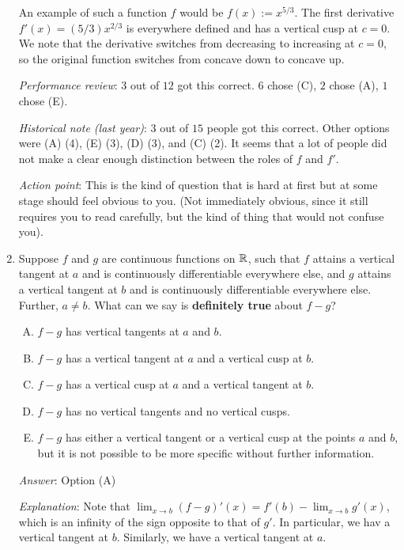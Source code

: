 \documentclass[10pt]{amsart}
\begin{document}
\begin{enumerate}
  An example of such a function $f$ would be $f(x) := x^{5/3}$. The
  first derivative $f'(x) = (5/3)x^{2/3}$ is everywhere defined and
  has a vertical cusp at $c = 0$. We note that the derivative switches
  from decreasing to increasing at $c = 0$, so the original function
  switches from concave down to concave up.
  
  {\em Performance review}: $3$ out of $12$ got this correct. $6$
  chose (C), $2$ chose (A), $1$ chose (E).

  {\em Historical note (last year)}: $3$ out of $15$ people got this
  correct. Other options were (A) (4), (E) (3), (D) (3), and (C) (2).
  It seems that a lot of people did not make a clear enough
  distinction between the roles of $f$ and $f'$.

  {\em Action point}: This is the kind of question that is hard at
  first but at some stage should feel obvious to you. (Not immediately
  obvious, since it still requires you to read carefully, but the kind
  of thing that would not confuse you).

\item Suppose $f$ and $g$ are continuous functions on $\mathbb{R}$, such that
  $f$ attains a vertical tangent at $a$ and is continuously
  differentiable everywhere else, and $g$ attains a vertical tangent
  at $b$ and is continuously differentiable everywhere else. Further,
  $a \ne b$. What can we say is {\bf definitely true} about $f - g$?

  \begin{enumerate}[(A)]
  \item $f - g$ has vertical tangents at $a$ and $b$.
  \item $f - g$ has a vertical tangent at $a$ and a vertical cusp at $b$.
  \item $f - g$ has a vertical cusp at $a$ and a vertical tangent at $b$.
  \item $f - g$ has no vertical tangents and no vertical cusps.
  \item $f - g$ has either a vertical tangent or a vertical cusp at
    the points $a$ and $b$, but it is not possible to be more specific
    without further information.
  \end{enumerate}

  {\em Answer}: Option (A)

  {\em Explanation}: Note that $\lim_{x \to b} (f - g)'(x) = f'(b) -
  \lim_{x \to b}g'(x)$, which is an infinity of the sign opposite to
  that of $g'$. In particular, we hav a vertical tangent at
  $b$. Similarly, we have a vertical tangent at $a$.


\end{enumerate}
\end{document}
